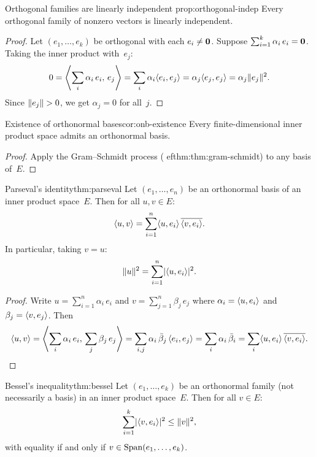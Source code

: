 \begin{proposition}{Orthogonal families are linearly independent}%
{prop:orthogonal-indep}
Every orthogonal family of nonzero vectors is linearly independent.
\end{proposition}

\begin{proof}
Let $(e_1,\ldots,e_k)$ be orthogonal with each $e_i\neq\vzero$.
Suppose $\sum_{i=1}^k\alpha_i\,e_i = \vzero$.  Taking the inner
product with~$e_j$:
\[
  0 = \inner*{\sum_i\alpha_i\,e_i,\, e_j}
    = \sum_i\alpha_i\inner{e_i,e_j}
    = \alpha_j\inner{e_j,e_j}
    = \alpha_j\norm{e_j}^2.
\]
Since $\norm{e_j}>0$, we get $\alpha_j = 0$ for all~$j$.
\end{proof}

\begin{corollary}{Existence of orthonormal bases}{cor:onb-existence}
Every finite-dimensional inner product space admits an orthonormal basis.
\end{corollary}

\begin{proof}
Apply the Gram--Schmidt process (
ef{thm:thm:gram-schmidt}) to any basis
of~$E$.
\end{proof}

\begin{theorem}{Parseval's identity}{thm:parseval}
Let $(e_1,\ldots,e_n)$ be an orthonormal basis of an inner product
space~$E$.  Then for all $u,v\in E$:
\[
  \inner{u,v} = \sum_{i=1}^n \inner{u,e_i}\,\overline{\inner{v,e_i}}.
\]
In particular, taking $v = u$:
\[
  \norm{u}^2 = \sum_{i=1}^n \abs{\inner{u,e_i}}^2.
\]
\end{theorem}

\begin{proof}
Write $u = \sum_{i=1}^n\alpha_i\, e_i$ and $v = \sum_{j=1}^n\beta_j\, e_j$
where $\alpha_i = \inner{u,e_i}$ and $\beta_j = \inner{v,e_j}$.  Then
\[
  \inner{u,v} = \inner*{\sum_i\alpha_i\,e_i,\,\sum_j\beta_j\,e_j}
    = \sum_{i,j}\alpha_i\,\bar{\beta}_j\,\inner{e_i,e_j}
    = \sum_i\alpha_i\,\bar{\beta}_i
    = \sum_i\inner{u,e_i}\,\overline{\inner{v,e_i}}. \qedhere
\]
\end{proof}

\begin{theorem}{Bessel's inequality}{thm:bessel}
Let $(e_1,\ldots,e_k)$ be an orthonormal family (not necessarily a
basis) in an inner product space~$E$.  Then for all $v\in E$:
\[
  \sum_{i=1}^k \abs{\inner{v,e_i}}^2 \leq \norm{v}^2,
\]
with equality if and only if $v\in\Span(e_1,\ldots,e_k)$.
\end{theorem}


